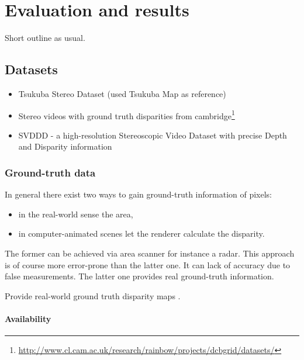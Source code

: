 \chapter{Evaluation and results}
\label{chap:eval}

Short outline as usual.


\section{Datasets}
\label{sec:datasets}

\begin{itemize}
  \item Tsukuba Stereo Dataset (used Tsukuba Map as reference)
  \item Stereo videos with ground truth disparities from cambridge\footnote{\url{http://www.cl.cam.ac.uk/research/rainbow/projects/dcbgrid/datasets/}}
  \item SVDDD - a high-resolution Stereoscopic Video Dataset with precise Depth and Disparity information
\end{itemize}


\subsection*{Ground-truth data}

In general there exist two ways to gain ground-truth information of pixels:
\begin{itemize}
  \item in the real-world sense the area,
  \item in computer-animated scenes let the renderer calculate the disparity.
\end{itemize}

\noindent The former can be achieved via area scanner for instance a radar.
This approach is of course more error-prone than the latter one.
It can lack of accuracy due to false measurements.
The latter one provides real ground-truth information.

Provide real-world ground truth disparity maps \citep{kondermann2015stereo}.

\subsubsection*{Availability}

